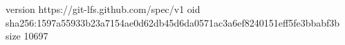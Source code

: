 version https://git-lfs.github.com/spec/v1
oid sha256:1597a55933b23a7154ae0d62db45d6da0571ac3a6ef8240151eff5fe3bbabf3b
size 10697
